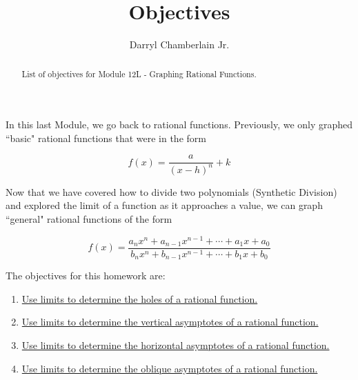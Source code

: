 \documentclass{ximera}
\author{Darryl Chamberlain Jr.}
\title{Objectives}
\begin{document}
\begin{abstract}
List of objectives for Module 12L - Graphing Rational Functions. 
\end{abstract}

\maketitle

In this last Module, we go back to rational functions. Previously, we only graphed ``basic" rational functions that were in the form

$$ f(x) = \frac{a}{(x-h)^n} + k $$

Now that we have covered how to divide two polynomials (Synthetic Division) and explored the limit of a function as it approaches a value, we can graph ``general" rational functions of the form 

$$ f(x) = \frac{a_n x^n + a_{n-1} x^{n-1} + \cdots + a_1 x + a_0}{b_n x^n + b_{n-1} x^{n-1} + \cdots + b_1 x + b_0}$$




The objectives for this homework are: 
\begin{enumerate}
\item \href{https://cnx.org/contents/mwjClAV_@8.21:KNTP2r7D@14/Rational-Functions}{Use limits to determine the holes of a rational function.}

\item \href{https://cnx.org/contents/mwjClAV_@8.21:KNTP2r7D@14/Rational-Functions}{Use limits to determine the vertical asymptotes of a rational function.}

\item \href{https://cnx.org/contents/mwjClAV_@8.21:KNTP2r7D@14/Rational-Functions}{Use limits to determine the horizontal asymptotes of a rational function.}

\item \href{https://cnx.org/contents/mwjClAV_@8.21:KNTP2r7D@14/Rational-Functions}{Use limits to determine the oblique asymptotes of a rational function.}
\end{enumerate}
\end{document}
